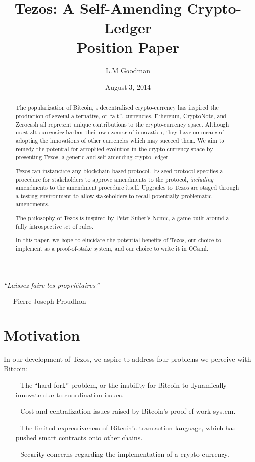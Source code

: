 \documentclass[letterpaper]{article}
\author{L.M Goodman}
\date{August 3, 2014}
\title{Tezos: A Self-Amending Crypto-Ledger \\ Position Paper}
\begin{document}
\maketitle



\epigraph{\emph{``Laissez faire les propri\'{e}taires.''}}
{--- \textup{Pierre-Joseph Proudhon}}

\begin{abstract}
The popularization of Bitcoin, a decentralized crypto-currency has inspired the
production of several alternative, or ``alt'', currencies. Ethereum, CryptoNote,
and Zerocash all represent unique contributions to the crypto-currency space. 
Although most alt currencies harbor their own source of innovation, they have
no means of adopting the innovations of other currencies which may succeed them.
We aim to remedy the potential for atrophied evolution in the crypto-currency 
space by presenting Tezos, a generic and self-amending crypto-ledger.

Tezos can instanciate any blockchain based protocol. Its seed protocol specifies
a procedure for stakeholders to approve amendments to the protocol,
\emph{including} amendments to the amendment procedure itself.
Upgrades to Tezos are staged through a testing environment to allow
stakeholders to recall potentially problematic amendments.

The philosophy of Tezos is inspired by Peter Suber's Nomic\cite{Nomic},
a game built around a fully introspective set of rules.

In this paper, we hope to elucidate the potential benefits of Tezos,
our choice to implement as a proof-of-stake system, and our choice to write it
in OCaml.

\end{abstract}
\newpage
\tableofcontents

\section{Motivation}
In our development of Tezos, we aspire to address four problems we perceive with
Bitcoin\cite{Bitcoin}:
\begin{itemize}
\item[-] The ``hard fork'' problem, or the inability for Bitcoin to dynamically
innovate due to coordination issues.
\item[-] Cost and centralization issues raised by Bitcoin's proof-of-work 
system.
\item[-] The limited expressiveness of Bitcoin's transaction language, which has
pushed smart contracts onto other chains.
\item[-] Security concerns regarding the implementation of a crypto-currency.
\end{itemize}
\end{document}
